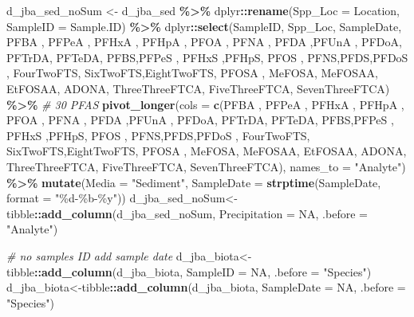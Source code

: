 \documentclass[
]{article}
\newenvironment{Shaded}{\begin{snugshade}}{\end{snugshade}}
\newcommand{\AttributeTok}[1]{\textcolor[rgb]{0.13,0.29,0.53}{#1}}
\newcommand{\CommentTok}[1]{\textcolor[rgb]{0.56,0.35,0.01}{\textit{#1}}}
\newcommand{\ConstantTok}[1]{\textcolor[rgb]{0.56,0.35,0.01}{#1}}
\newcommand{\FunctionTok}[1]{\textcolor[rgb]{0.13,0.29,0.53}{\textbf{#1}}}
\newcommand{\NormalTok}[1]{#1}
\newcommand{\OtherTok}[1]{\textcolor[rgb]{0.56,0.35,0.01}{#1}}
\newcommand{\SpecialCharTok}[1]{\textcolor[rgb]{0.81,0.36,0.00}{\textbf{#1}}}
\newcommand{\StringTok}[1]{\textcolor[rgb]{0.31,0.60,0.02}{#1}}
\begin{document}
\begin{Shaded}
\begin{Highlighting}[]
\NormalTok{d\_jba\_sed\_noSum }\OtherTok{\textless{}{-}}\NormalTok{ d\_jba\_sed }\SpecialCharTok{\%\textgreater{}\%}
\NormalTok{  dplyr}\SpecialCharTok{::}\FunctionTok{rename}\NormalTok{(}\AttributeTok{Spp\_Loc =}\NormalTok{ Location,}
                \AttributeTok{SampleID =}\NormalTok{ Sample.ID) }\SpecialCharTok{\%\textgreater{}\%}
\NormalTok{  dplyr}\SpecialCharTok{::}\FunctionTok{select}\NormalTok{(SampleID, Spp\_Loc, SampleDate, }
\NormalTok{                PFBA , PFPeA , PFHxA , PFHpA , PFOA ,}
\NormalTok{                PFNA , PFDA ,PFUnA , PFDoA, PFTrDA,}
\NormalTok{                PFTeDA, PFBS,PFPeS , PFHxS ,PFHpS,}
\NormalTok{                PFOS , PFNS,PFDS,PFDoS , FourTwoFTS,}
\NormalTok{                SixTwoFTS,EightTwoFTS, PFOSA , MeFOSA, MeFOSAA,}
\NormalTok{                EtFOSAA, ADONA, ThreeThreeFTCA,}
\NormalTok{                FiveThreeFTCA, SevenThreeFTCA) }\SpecialCharTok{\%\textgreater{}\%} \CommentTok{\# 30 PFAS}
  \FunctionTok{pivot\_longer}\NormalTok{(}\AttributeTok{cols =} \FunctionTok{c}\NormalTok{(PFBA , PFPeA , PFHxA , PFHpA , PFOA ,}
\NormalTok{                PFNA , PFDA ,PFUnA , PFDoA, PFTrDA,}
\NormalTok{                PFTeDA, PFBS,PFPeS , PFHxS ,PFHpS,}
\NormalTok{                PFOS , PFNS,PFDS,PFDoS , FourTwoFTS,}
\NormalTok{                SixTwoFTS,EightTwoFTS, PFOSA , MeFOSA, MeFOSAA,}
\NormalTok{                EtFOSAA, ADONA, ThreeThreeFTCA, FiveThreeFTCA, SevenThreeFTCA),}
               \AttributeTok{names\_to =} \StringTok{"Analyte"}\NormalTok{) }\SpecialCharTok{\%\textgreater{}\%}
  \FunctionTok{mutate}\NormalTok{(}\AttributeTok{Media =} \StringTok{"Sediment"}\NormalTok{,}
         \AttributeTok{SampleDate =} \FunctionTok{strptime}\NormalTok{(SampleDate, }\AttributeTok{format =} \StringTok{"\%d{-}\%b{-}\%y"}\NormalTok{))}
\NormalTok{d\_jba\_sed\_noSum}\OtherTok{\textless{}{-}}\NormalTok{tibble}\SpecialCharTok{::}\FunctionTok{add\_column}\NormalTok{(d\_jba\_sed\_noSum, }\AttributeTok{Precipitation =} \ConstantTok{NA}\NormalTok{, }\AttributeTok{.before =} \StringTok{"Analyte"}\NormalTok{)}

\CommentTok{\# no samples ID add sample date}
\NormalTok{d\_jba\_biota}\OtherTok{\textless{}{-}}\NormalTok{tibble}\SpecialCharTok{::}\FunctionTok{add\_column}\NormalTok{(d\_jba\_biota, }\AttributeTok{SampleID =} \ConstantTok{NA}\NormalTok{, }\AttributeTok{.before =} \StringTok{"Species"}\NormalTok{)}
\NormalTok{d\_jba\_biota}\OtherTok{\textless{}{-}}\NormalTok{tibble}\SpecialCharTok{::}\FunctionTok{add\_column}\NormalTok{(d\_jba\_biota, }\AttributeTok{SampleDate =} \ConstantTok{NA}\NormalTok{, }\AttributeTok{.before =} \StringTok{"Species"}\NormalTok{)}


\end{Highlighting}
\end{Shaded}
\end{document}
